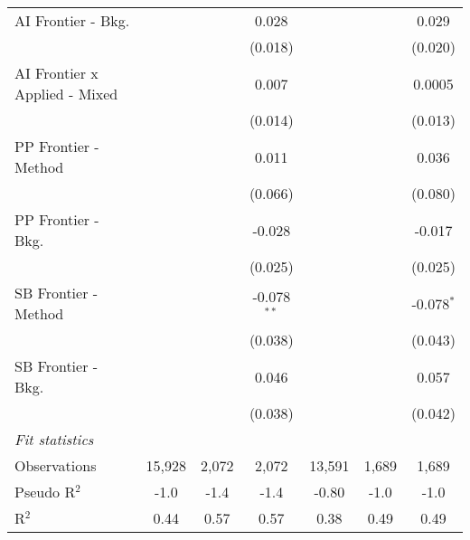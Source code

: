 \begin{tabular}{lcccccc}
   AI Frontier - Bkg.            &             &              & 0.028         &              &          & 0.029\\   
                                 &             &              & (0.018)       &              &          & (0.020)\\   
   AI Frontier x Applied - Mixed &             &              & 0.007         &              &          & 0.0005\\   
                                 &             &              & (0.014)       &              &          & (0.013)\\   
   PP Frontier - Method          &             &              & 0.011         &              &          & 0.036\\   
                                 &             &              & (0.066)       &              &          & (0.080)\\   
   PP Frontier - Bkg.            &             &              & -0.028        &              &          & -0.017\\   
                                 &             &              & (0.025)       &              &          & (0.025)\\   
   SB Frontier - Method          &             &              & -0.078$^{**}$ &              &          & -0.078$^{*}$\\   
                                 &             &              & (0.038)       &              &          & (0.043)\\   
   SB Frontier - Bkg.            &             &              & 0.046         &              &          & 0.057\\   
                                 &             &              & (0.038)       &              &          & (0.042)\\   
   \midrule
   \emph{Fit statistics}\\
   Observations                  & 15,928      & 2,072        & 2,072         & 13,591       & 1,689    & 1,689\\  
   Pseudo R$^2$                  & -1.0        & -1.4         & -1.4          & -0.80        & -1.0     & -1.0\\  
   R$^2$                         & 0.44        & 0.57         & 0.57          & 0.38         & 0.49     & 0.49\\  
   

\end{tabular}
